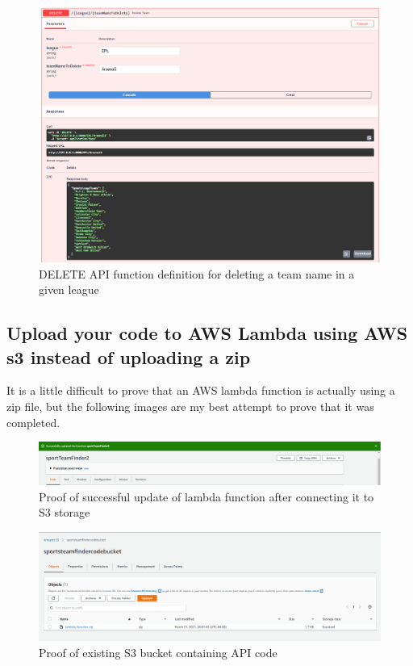 \documentclass[12pt, letterpaper, final, onecolumn, titlepage] {article}
\begin{document}
\begin{figure}[htbp]
	\centerline{\includegraphics[scale=.4]{4/delete_aresnal2.png}}
	\caption{DELETE API function definition for deleting a team name in a given league}
	\label{deleteTeam}
\end{figure}
\pagebreak

\subsection{Upload your code to AWS Lambda using AWS s3 instead of uploading a zip}
It is a little difficult to prove that an AWS lambda function is actually using a zip file, but the following images are my best attempt to prove that it was completed.

\begin{figure}[htbp]
	\centerline{\includegraphics[scale=.4]{1/sucessfulUpdate.png}}
	\caption{Proof of successful update of lambda function after connecting it to S3 storage }
	\label{sucessfulUpdate}
\end{figure}
\begin{figure}[htbp]
	\centerline{\includegraphics[scale=.4]{1/S3_Proof.png}}
	\caption{Proof of existing S3 bucket containing API code}
	\label{S3Proof}
\end{figure}
\end{document}
